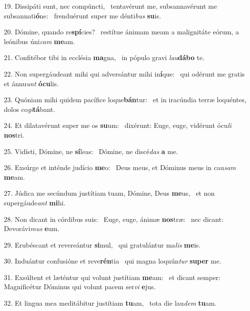19. Dissipáti sunt, nec compúncti, \dag\  tentavérunt me, subsannavérunt me subsannati\textbf{ó}ne: \ast\  frenduérunt super me dénti\textit{bus} \textbf{su}is.\

20. Dómine, quando re\textbf{spí}cies? \ast\  restítue ánimam meam a malignitáte eórum, a leónibus úni\textit{cam} \textbf{me}am.\

21. Confitébor tibi in ecclésia \textbf{ma}gna, \ast\  in pópulo gravi \textit{lau}\textbf{dá}\textbf{bo} te.\

22. Non supergáudeant mihi qui adversántur mihi in\textbf{í}que: \ast\  qui odérunt me gratis et ánnu\textit{unt} \textbf{ó}\textbf{cu}lis.\

23. Quóniam mihi quidem pacífice loque\textbf{bán}tur: \ast\  et in iracúndia terræ loquéntes, dolos co\textit{gi}\textbf{tá}bant.\

24. Et dilatavérunt super me os \textbf{su}um: \ast\  dixérunt: Euge, euge, vidérunt ócu\textit{li} \textbf{nos}tri.\

25. Vidísti, Dómine, ne \textbf{sí}leas: \ast\  Dómine, ne discé\textit{das} \textbf{a} me.\

26. Exsúrge et inténde judício \textbf{me}o: \ast\  Deus meus, et Dóminus meus in cau\textit{sam} \textbf{me}am.\

27. Júdica me secúndum justítiam tuam, Dómine, Deus \textbf{me}us, \ast\  et non supergáude\textit{ant} \textbf{mi}hi.\

28. Non dicant in córdibus suis: \dag\  Euge, euge, ánimæ \textbf{nos}træ: \ast\  nec dicant: Devorávi\textit{mus} \textbf{e}um.\

29. Erubéscant et revereántur \textbf{si}mul, \ast\  qui gratulántur ma\textit{lis} \textbf{me}is.\

30. Induántur confusióne et reve\textbf{rén}tia \ast\  qui magna loquún\textit{tur} \textbf{su}\textbf{per} me.\

31. Exsúltent et læténtur qui volunt justítiam \textbf{me}am: \ast\  et dicant semper: Magnificétur Dóminus qui volunt pacem ser\textit{vi} \textbf{e}jus.\

32. Et lingua mea meditábitur justítiam \textbf{tu}am, \ast\  tota die lau\textit{dem} \textbf{tu}am.\

